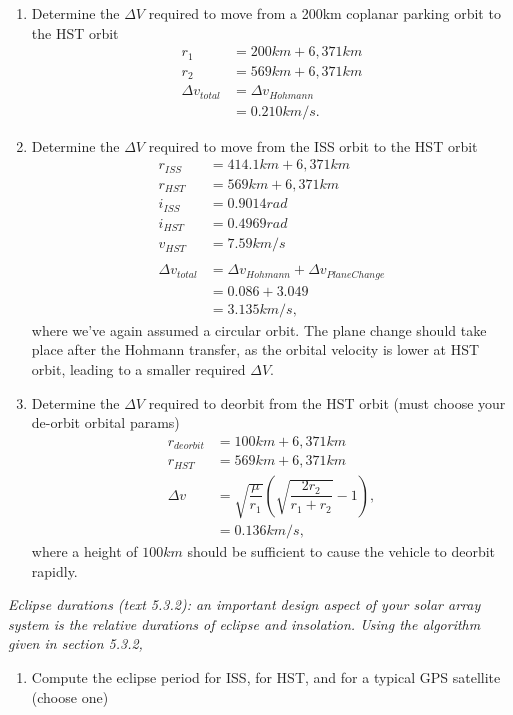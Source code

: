 \documentclass[onecolumn,10pt]{jhwhw}
\begin{document}
\begin{enumerate}
\itemsep0em
\item Determine the $\Delta V$ required to move from a 200km coplanar parking orbit to the HST orbit
\begin{align*}
r_1 &= 200 km + 6,371 km \\
r_2 &= 569 km + 6,371 km \\
\Delta v_{total} &= \Delta v_{Hohmann} \\
                 &= 0.210 km/s.
\end{align*}
\item Determine the $\Delta V$ required to move from the ISS orbit to the HST orbit
\begin{align*}
r_{ISS} &= 414.1 km + 6,371 km \\
r_{HST} &= 569 km + 6,371 km \\
i_{ISS} &= 0.9014 rad \\
i_{HST} &= 0.4969 rad \\
v_{HST} &= 7.59 km/s \\
\\
\Delta v_{total} &= \Delta v_{Hohmann} + \Delta v_{Plane Change} \\
                 &= 0.086 + 3.049 \\
                 &= 3.135 km/s,
\end{align*}
where we've again assumed a circular orbit. The plane change should take place after the Hohmann transfer, as the orbital velocity is lower at HST orbit, leading to a smaller required $\Delta V$.

\item Determine the $\Delta V$ required to deorbit from the HST orbit (must choose your de-orbit orbital params)
\begin{align*}
r_{deorbit} &= 100 km + 6,371 km \\
r_{HST} &= 569 km + 6,371 km \\
\Delta v &= \sqrt{\dfrac{\mu}{r_1}} \left(\sqrt{\dfrac{2r_2}{r_1 + r_2}} -1 \right), \\
         &= 0.136 km/s,
\end{align*}
where a height of $100km$ should be sufficient to cause the vehicle to deorbit rapidly.
\end{enumerate}

\problem{}
\textit{Eclipse durations (text 5.3.2): an important design aspect of your solar array system is the relative durations of eclipse and insolation. Using the algorithm given in section 5.3.2,}
\begin{enumerate}
\itemsep0em
\item Compute the eclipse period for ISS, for HST, and for a typical GPS satellite (choose one)
\end{enumerate}
\end{document}
